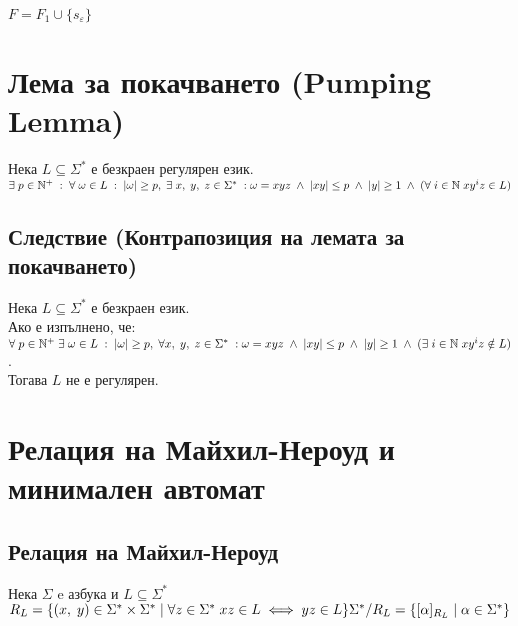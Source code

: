 \documentclass[12pt]{article}
\newcommand{\N}{\mathbb{N}}
\begin{document}
$F = F_1 \cup \{s_\varepsilon\}$

\section*{Лема за покачването (Pumping Lemma)}

Нека $L \subseteq \Sigma^*$ е безкраен регулярен език. \\

$\exists \; p \in \N^+ \; : \; \forall \; \omega \in L \; : \; |\omega| \geq p, \; \exists \; x, \; y, \; z \in \Sigma^* \; : \\\\
\omega = xyz \; \land \; |xy| \leq p \; \land \; |y| \geq 1 \; \land \; (\forall \; i \in \N \; xy^iz \in L) $

\subsection*{Следствие (Контрапозиция на лемата за покачването)}

Нека $L \subseteq \Sigma^*$ е безкраен език. \\

Ако е изпълнено, че: \\
 
$\forall \; p \in \N^+ \; \exists \; \omega \in L \; : \; |\omega| \geq p, \; \forall x, \; y, \; z \in \Sigma^* \; : \\\\
 \omega = xyz \; \land \; |xy| \leq p \; \land \; |y| \geq 1 \; \land \; (\exists \; i \in \N \; xy^iz \notin L) $. \\

Тогава $L$ не е регулярен.

\section*{Релация на Майхил-Нероуд и минимален автомат}

\subsection*{Релация на Майхил-Нероуд}

Нека $\Sigma$ e азбука и $L \subseteq \Sigma^*$ \\

$R_L = \{(x, \; y) \in \Sigma^*\times\Sigma^* \; | \; \forall z \in \Sigma^* \; xz \in L \iff yz \in L\} \\\\
\Sigma^*/R_L = \{[\alpha]_{R_L} \; | \; \alpha \in \Sigma^*\}$
\end{document}
